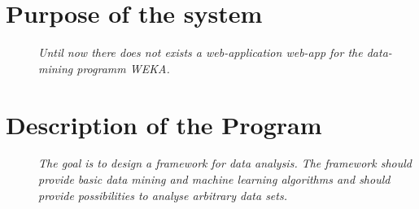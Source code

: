 
\section{Purpose of the system}
\begin{description}
  \item [] 
    \textit{Until now there does not exists a web-application \gls{web-app} for the data-mining programm \gls{WEKA}.
    }
\end{description}

\section{Description of the Program}
\begin{description}
  \item [] 
    \textit{The goal is to design a \gls{framework} for data analysis. The framework should provide basic data mining and machine learning algorithms and should provide possibilities to analyse arbitrary data sets.
    }
\end{description}
